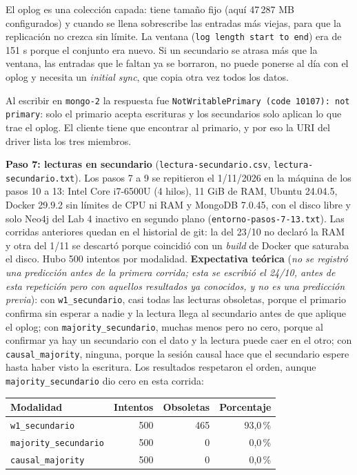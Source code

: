 \documentclass[10pt,letterpaper]{article}
\begin{document}
El oplog es una colección capada: tiene tamaño fijo (aquí 47\,287 MB configurados) y cuando se llena
sobrescribe las entradas más viejas, para que la replicación no crezca sin límite. La ventana
(\texttt{log length start to end}) era de 151 s porque el conjunto era nuevo. Si un secundario se atrasa
más que la ventana, las entradas que le faltan ya se borraron, no puede ponerse al día con el oplog y
necesita un \emph{initial sync}, que copia otra vez todos los datos.

Al escribir en \texttt{mongo-2} la respuesta fue \texttt{NotWritablePrimary (code 10107): not primary}:
solo el primario acepta escrituras y los secundarios solo aplican lo que trae el oplog. El cliente tiene
que encontrar al primario, y por eso la URI del driver lista los tres miembros.

\textbf{Paso 7: lecturas en secundario} (\texttt{lectura-secundario.csv},
\texttt{lectura-secundario.txt}). Los pasos 7 a 9 se repitieron el 1/11/2026 en la máquina de los pasos 10 a 13:
Intel Core i7-6500U (4 hilos), 11 GiB de RAM, Ubuntu 24.04.5, Docker 29.9.2 sin límites de CPU ni RAM y MongoDB
7.0.45, con el disco libre y solo Neo4j del Lab 4 inactivo en segundo plano (\texttt{entorno-pasos-7-13.txt}). Las
corridas anteriores quedan en el historial de git: la del 23/10 no declaró la RAM y otra del 1/11 se descartó porque
coincidió con un \emph{build} de Docker que saturaba el disco. Hubo 500 intentos por modalidad.
\textbf{Expectativa teórica} (\emph{no se registró una predicción antes de la primera corrida; esta se escribió el
24/10, antes de esta repetición pero con aquellos resultados ya conocidos, y no es una predicción previa}): con \texttt{w1\_secundario}, casi todas las lecturas obsoletas,
porque el primario confirma sin esperar a nadie y la lectura llega al secundario antes de que aplique el oplog;
con \texttt{majority\_secundario}, muchas menos pero no cero, porque al confirmar ya hay un secundario con el
dato y la lectura puede caer en el otro; con \texttt{causal\_majority}, ninguna, porque la sesión causal hace
que el secundario espere hasta haber visto la escritura. Los resultados respetaron el orden, aunque
\texttt{majority\_secundario} dio cero en esta corrida:

\begin{center}\footnotesize
\begin{tabular}{@{}lrrr@{}}
\toprule
\textbf{Modalidad} & \textbf{Intentos} & \textbf{Obsoletas} & \textbf{Porcentaje} \\
\midrule
\texttt{w1\_secundario} & 500 & 465 & 93,0\,\% \\
\texttt{majority\_secundario} & 500 & 0 & 0,0\,\% \\
\texttt{causal\_majority} & 500 & 0 & 0,0\,\% \\
\bottomrule
\end{tabular}
\end{center}
\end{document}
